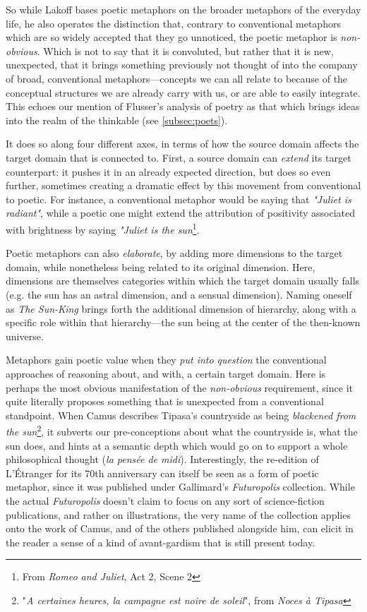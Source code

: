 So while Lakoff bases poetic metaphors on the broader metaphors of the everyday life, he also operates the distinction that, contrary to conventional metaphors which are so widely accepted that they go unnoticed, the poetic metaphor is \emph{non-obvious}. Which is not to say that it is convoluted, but rather that it is new, unexpected, that it brings something previously not thought of into the company of broad, conventional metaphors—concepts we can all relate to because of the conceptual structures we are already carry with us, or are able to easily integrate. This echoes our mention of Flusser's analysis of poetry as that which brings ideas into the realm of the thinkable (see \ref{subsec:poets}).

It does so along four different axes, in terms of how the source domain affects the target domain that is connected to. First, a source domain can \emph{extend} its target counterpart: it pushes it in an already expected direction, but does so even further, sometimes creating a dramatic effect by this movement from conventional to poetic. For instance, a conventional metaphor would be saying that \emph{"Juliet is radiant"}, while a poetic one might extend the attribution of positivity associated with brightness by saying \emph{"Juliet is the sun}\footnote{From \emph{Romeo and Juliet}, Act 2, Scene 2}.

Poetic metaphors can also \emph{elaborate}, by adding more dimensions to the target domain, while nonetheless being related to its original dimension. Here, dimensions are themselves categories within which the target domain usually falls (e.g. the sun has an astral dimension, and a sensual dimension). Naming oneself as \emph{The Sun-King} brings forth the additional dimension of hierarchy, along with a specific role within that hierarchy—the sun being at the center of the then-known universe.

Metaphors gain poetic value when they \emph{put into question} the conventional approaches of reasoning about, and with, a certain target domain. Here is perhaps the most obvious manifestation of the \emph{non-obvious} requirement, since it quite literally proposes something that is unexpected from a conventional standpoint. When Camus describes Tipasa's countryside as being \emph{blackened from the sun}\footnote{"\emph{A certaines heures, la campagne est noire de soleil}", from \emph{Noces à Tipasa}}, it subverts our pre-conceptions about what the countryside is, what the sun does, and hints at a semantic depth which would go on to support a whole philosophical thought (\emph{la pensée de midi}). Interestingly, the re-edition of L'Étranger for its 70th anniversary can itself be seen as a form of poetic metaphor, since it was published under Gallimard's \emph{Futuropolis} collection. While the actual \emph{Futuropolis} doesn't claim to focus on any sort of science-fiction publications, and rather on illustrations, the very name of the collection applies onto the work of Camus, and of the others published alongside him, can elicit in the reader a sense of a kind of avant-gardism that is still present today.

